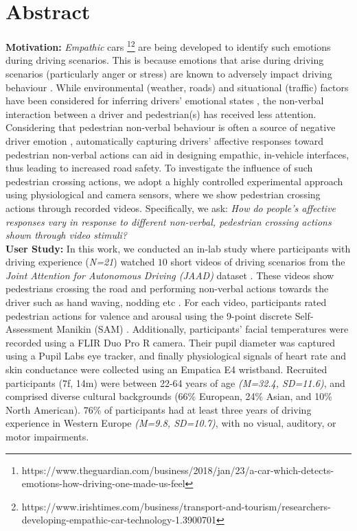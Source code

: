 \documentclass[acmlarge]{acmart}
\begin{document}
\section*{Abstract}
\textbf{Motivation:} 
\textit{Empathic} cars \footnote{https://www.theguardian.com/business/2018/jan/23/a-car-which-detects-emotions-how-driving-one-made-us-feel}\footnote{https://www.irishtimes.com/business/transport-and-tourism/researchers-developing-empathic-car-technology-1.3900701} are being developed to identify such emotions during driving scenarios. This is because emotions that arise during driving scenarios (particularly anger or stress) are known to adversely impact driving behaviour \cite{2015:tf:jeon}. While environmental (weather, roads) and situational (traffic) factors have been considered for inferring drivers' emotional states \cite{2018:frontiers:habibovic, 2019:MTI:braun, jeon2016don}, the non-verbal interaction between a driver and pedestrian(s) has received less attention. Considering that pedestrian non-verbal behaviour is often a source of negative driver emotion \cite{zepf2019towards}, automatically capturing drivers' affective responses toward pedestrian non-verbal actions can aid in designing empathic, in-vehicle interfaces, thus leading to increased road safety. To investigate the influence of such pedestrian crossing actions, we adopt a highly controlled experimental approach using physiological and camera sensors, where we show pedestrian crossing actions through recorded videos. Specifically, we ask: \textit{How do people's affective responses vary in response to different non-verbal, pedestrian crossing actions shown through video stimuli?}
\\


\noindent \textbf{User Study:}  
In this work, we conducted an in-lab study where participants with driving experience (\textit{N=21}) watched $10$ short videos of driving scenarios from the \textit{Joint Attention for Autonomous Driving (JAAD)} dataset \cite{2017:IV:rasouli, Ghosh2022}. These videos show pedestrians crossing the road and performing non-verbal actions towards the driver such as hand waving, nodding etc \cite{2016:arxiv:jaad}. For each video, participants rated pedestrian actions for valence and arousal using the 9-point discrete Self-Assessment Manikin (SAM) \cite{bradley1994measuring}. Additionally, participants' facial temperatures were recorded using a FLIR Duo Pro R camera. Their pupil diameter was captured using a Pupil Labs eye tracker, and finally physiological signals of heart rate and skin conductance were collected using an Empatica E4 wristband. Recruited participants (7f, 14m) were between 22-64 years of age \textit{(M=32.4, SD=11.6)}, and comprised diverse cultural backgrounds (66\% European, 24\% Asian, and 10\% North American). $76\%$ of participants had at least three years of driving experience in Western Europe \textit{(M=9.8, SD=10.7)}, with no visual, auditory, or motor impairments.
\\
\end{document}
